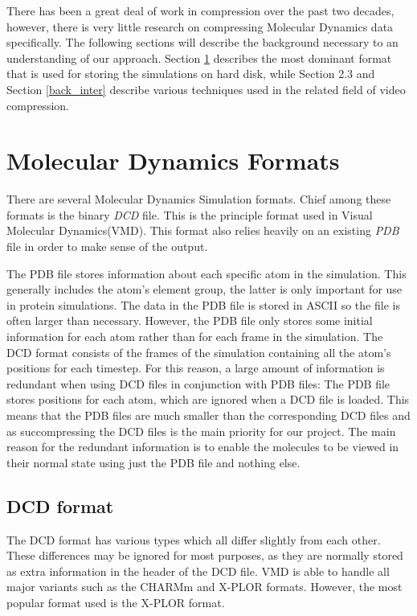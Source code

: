 \documentclass[a4paper,11pt]{report}
\begin{document}
There has been a great deal of work in compression over the past two decades\cite{jain1981image}\cite{storer1988data}, however, there is very little research on compressing Molecular Dynamics data specifically.
The following sections will describe the background necessary to an understanding of our approach.
Section \ref{back_mdf} describes the most dominant format that is used for storing the simulations on hard disk,
while Section 2.3 and Section \ref{back_inter} describe various techniques used in the related field of video compression.

\section{Molecular Dynamics Formats}
\label{back_mdf}

There are several Molecular Dynamics Simulation formats. Chief among these formats is the binary \emph{DCD} file. This is the principle format used in Visual Molecular Dynamics(VMD). This format also relies heavily on an existing \emph{PDB} file in order to make sense of the output.

The PDB file stores information about each specific atom in the simulation. This generally includes the atom's element group, the latter is only important for use in protein simulations. The data in the PDB file is stored in ASCII so the file is often larger than necessary. However, the PDB file only stores some initial information for each atom rather than for each frame in the simulation. The DCD format consists of the frames of the simulation containing all the atom's positions for each timestep. For this reason, a large amount of information is redundant when using DCD files in conjunction with PDB files: The PDB file stores positions for each atom, which are ignored when a DCD file is loaded. This means that the PDB files are much smaller than the corresponding DCD files and as succompressing the DCD files is the main priority for our project.  The main reason for the redundant information is to enable the molecules to be viewed in their normal state using just the PDB file and nothing else.

\subsection{DCD format}
The DCD format has various types which all differ slightly from each other. These differences may be ignored for most purposes, as they are normally stored as extra information in the header of the DCD file. VMD is able to handle all major variants such as the CHARMm and X-PLOR formats. However, the most popular format used is the X-PLOR format. \cite{vmddcdformat}
\end{document}
